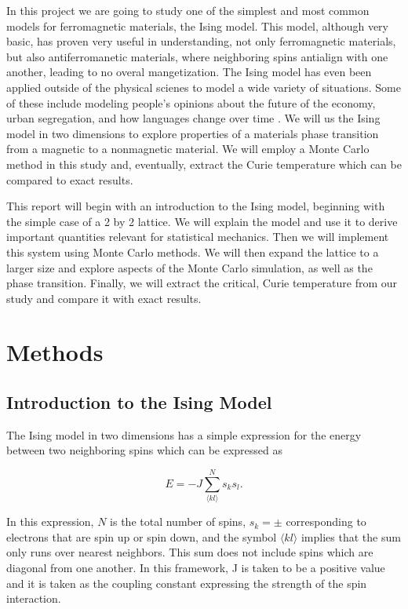 \documentclass[%
oneside,                 %
final,                   %
10pt]{article}
\begin{document}
In this project we are going to study one of the simplest and most common models for ferromagnetic materials, the Ising model.  This model, although very basic, has proven very useful in understanding, not only ferromagnetic materials, but also antiferromanetic materials, where neighboring spins antialign with one another, leading to no overal mangetization.  The Ising model has even been applied outside of the physical scienes to model a wide variety of situations.  Some of these include modeling people's opinions about the future of the economy, urban segregation, and how languages change over time \cite{otherising}.  We will us the Ising model in two dimensions to explore properties of a materials phase transition from a magnetic to a nonmagnetic material.  We will employ a Monte Carlo method in this study and, eventually, extract the Curie temperature which can be compared to exact results.

This report will begin with an introduction to the Ising model, beginning with the simple case of a 2 by 2 lattice.  We will explain the model and use it to derive important quantities relevant for statistical mechanics.  Then we will implement this system using Monte Carlo methods.  We will then expand the lattice to a larger size and explore aspects of the Monte Carlo simulation, as well as the phase transition.  Finally, we will extract the critical, Curie temperature from our study and compare it with exact results.

\section{Methods}

\subsection{Introduction to the Ising Model}

The Ising model in two dimensions has a simple expression for the energy between two neighboring spins which can be expressed as

\begin{equation*}
E=-J \sum_{\langle k l \rangle}^N s_k s_l.
\end{equation*}

In this expression, $N$ is the total number of spins, $s_k = \pm$ corresponding to electrons that are spin up or spin down, and the symbol $ \langle kl \rangle$ implies that the sum only runs over nearest neighbors.  This sum does not include spins which are diagonal from one another.  In this framework, J is taken to be a positive value and it is taken as the coupling constant expressing the strength of the spin interaction.
\end{document}
